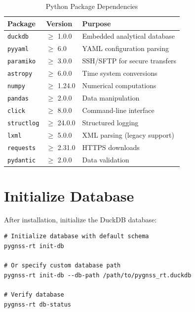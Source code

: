 \documentclass[11pt,a4paper,twoside]{report}
\begin{document}
\begin{table}[H]
\centering
\caption{Python Package Dependencies}
\label{tab:dependencies}
\begin{tabular}{@{}llp{6cm}@{}}
\toprule
\textbf{Package} & \textbf{Version} & \textbf{Purpose} \\
\midrule
\texttt{duckdb} & $\geq$ 1.0.0 & Embedded analytical database \\
\texttt{pyyaml} & $\geq$ 6.0 & YAML configuration parsing \\
\texttt{paramiko} & $\geq$ 3.0.0 & SSH/SFTP for secure transfers \\
\texttt{astropy} & $\geq$ 6.0.0 & Time system conversions \\
\texttt{numpy} & $\geq$ 1.24.0 & Numerical computations \\
\texttt{pandas} & $\geq$ 2.0.0 & Data manipulation \\
\texttt{click} & $\geq$ 8.0.0 & Command-line interface \\
\texttt{structlog} & $\geq$ 24.0.0 & Structured logging \\
\texttt{lxml} & $\geq$ 5.0.0 & XML parsing (legacy support) \\
\texttt{requests} & $\geq$ 2.31.0 & HTTPS downloads \\
\texttt{pydantic} & $\geq$ 2.0.0 & Data validation \\
\bottomrule
\end{tabular}
\end{table}

\section{Initialize Database}

After installation, initialize the DuckDB database:

\begin{lstlisting}[style=bashstyle, caption={Database Initialization}, label={lst:initdb}]
# Initialize database with default schema
pygnss-rt init-db

# Or specify custom database path
pygnss-rt init-db --db-path /path/to/pygnss_rt.duckdb

# Verify database
pygnss-rt db-status
\end{lstlisting}

\end{document}
